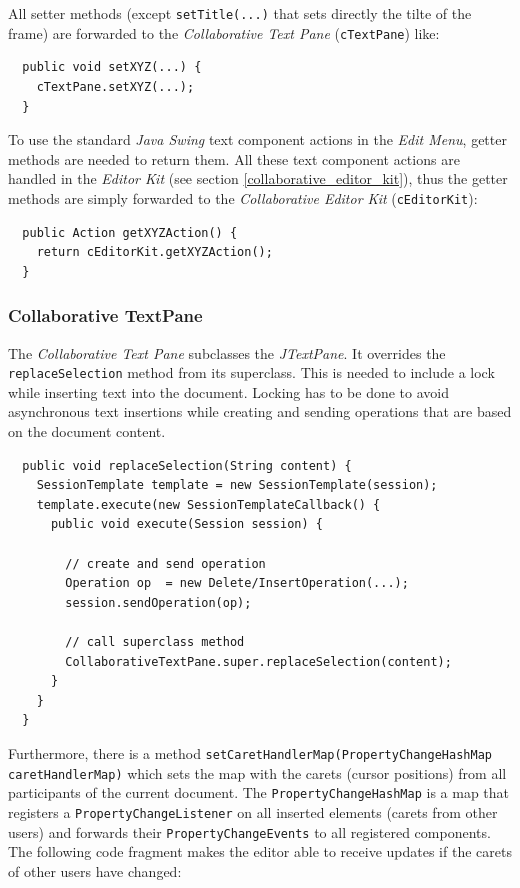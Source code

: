 All setter methods (except \texttt{setTitle(...)} that sets directly the tilte of the frame) are forwarded to the \textit{Collaborative Text Pane} (\texttt{cTextPane}) like:

\begin{verbatim}
  public void setXYZ(...) {
    cTextPane.setXYZ(...);
  }
\end{verbatim}

To use the standard \textit{Java Swing} text component actions in the \textit{Edit Menu}, getter methods are needed to return them. All these text component actions are handled in the \textit{Editor Kit} (see section \ref{collaborative_editor_kit}), thus the getter methods are simply forwarded to the \textit{Collaborative Editor Kit} (\texttt{cEditorKit}):

\begin{verbatim}
  public Action getXYZAction() {
    return cEditorKit.getXYZAction();
  }
\end{verbatim}


\subsubsection{Collaborative TextPane}
The \textit{Collaborative Text Pane} subclasses the \textit{JTextPane}. It overrides the \texttt{replaceSelection} method from its superclass. This is needed to include a lock while inserting text into the document. Locking has to be done to avoid asynchronous text insertions while creating and sending operations that are based on the document content.

\begin{verbatim}
  public void replaceSelection(String content) {
    SessionTemplate template = new SessionTemplate(session);
    template.execute(new SessionTemplateCallback() {
      public void execute(Session session) {

        // create and send operation
        Operation op  = new Delete/InsertOperation(...);
        session.sendOperation(op);

        // call superclass method
        CollaborativeTextPane.super.replaceSelection(content);
      }
    }
  }
\end{verbatim}

Furthermore, there is a method \texttt{setCaretHandlerMap(PropertyChangeHashMap caretHandlerMap)} which sets the map with the carets (cursor positions) from all participants of the current document. The \texttt{PropertyChangeHashMap} is a map that registers a \texttt{PropertyChangeListener} on all inserted elements (carets from other users) and forwards their \texttt{PropertyChangeEvents} to all registered components. The following code fragment makes the editor able to receive updates if the carets of other users have changed:

